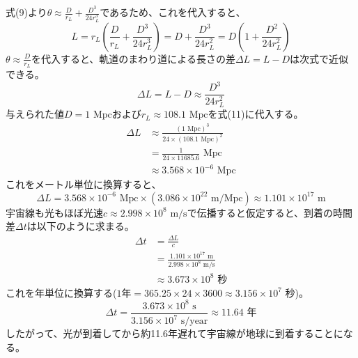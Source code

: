 \documentclass[a4paper,11pt]{jsarticle}
\begin{document}
式(9)より$\theta \approx \frac{D}{r_L} + \frac{D^3}{24 r_L^3}$であるため、これを代入すると、
\begin{equation}
    L = r_L \left( \frac{D}{r_L} + \frac{D^3}{24 r_L^3} \right) = D + \frac{D^3}{24 r_L^2} = D \left( 1 + \frac{D^2}{24 r_L^2} \right)
\end{equation}
$\theta \approx \frac{D}{r_L}$を代入すると、軌道のまわり道による長さの差$\Delta L = L - D$は次式で近似できる。
\begin{equation}
    \Delta L = L - D \approx \frac{D^3}{24 r_L^2}
\end{equation}
与えられた値$D = 1\text{ Mpc}$および$r_L \approx 108.1\text{ Mpc}$を式(11)に代入する。
\begin{align}
    \Delta L &\approx \frac{(1\text{ Mpc})^3}{24 \times (108.1\text{ Mpc})^2} \\
        &= \frac{1}{24 \times 11685.6}\text{ Mpc} \\
        &\approx 3.568 \times 10^{-6}\text{ Mpc}
\end{align}
これをメートル単位に換算すると、
\begin{equation}
    \Delta L = 3.568 \times 10^{-6}\text{ Mpc} \times (3.086 \times 10^{22}\text{ m/Mpc}) \approx 1.101 \times 10^{17}\text{ m}
\end{equation}
宇宙線も光もほぼ光速$c \approx 2.998 \times 10^8\text{ m/s}$で伝播すると仮定すると、到着の時間差$\Delta t$は以下のように求まる。
\begin{align}
    \Delta t &= \frac{\Delta L}{c} \\
        &= \frac{1.101 \times 10^{17}\text{ m}}{2.998 \times 10^8\text{ m/s}} \\
        &\approx 3.673 \times 10^8\text{ 秒}
\end{align}
これを年単位に換算する($1\text{年} = 365.25 \times 24 \times 3600 \approx 3.156 \times 10^7\text{ 秒}$)。
\begin{equation}
    \Delta t = \frac{3.673 \times 10^8\text{ s}}{3.156 \times 10^7\text{ s/year}} \approx 11.64\text{ 年}
\end{equation}
したがって、光が到着してから約11.6年遅れて宇宙線が地球に到着することになる。
\end{document}
